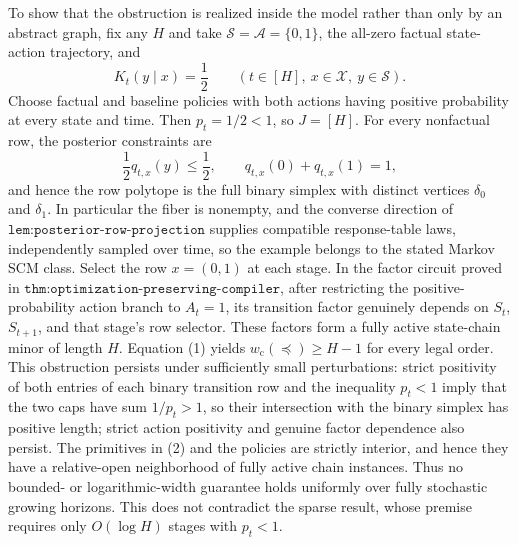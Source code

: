 To show that the obstruction is realized inside the model rather than only by an abstract graph, fix any \(H\) and take \(\mathcal S=\mathcal A=\{0,1\}\), the all-zero factual state-action trajectory, and
\[
 K_t(y\mid x)=\frac12
 \qquad(t\in[H],\ x\in\mathcal X,\ y\in\mathcal S).
 \tag{2}
\]
Choose factual and baseline policies with both actions having positive probability at every state and time.  Then \(p_t=1/2<1\), so \(J=[H]\).  For every nonfactual row, the posterior constraints are
\[
 \frac12q_{t,x}(y)\le\frac12,
 \qquad q_{t,x}(0)+q_{t,x}(1)=1,
\]
and hence the row polytope is the full binary simplex with distinct vertices \(\delta_0\) and \(\delta_1\).  In particular the fiber is nonempty, and the converse direction of \(\texttt{lem:posterior-row-projection}\) supplies compatible response-table laws, independently sampled over time, so the example belongs to the stated Markov SCM class.  Select the row \(x=(0,1)\) at each stage.  In the factor circuit proved in \(\texttt{thm:optimization-preserving-compiler}\), after restricting the positive-probability action branch to \(A_t=1\), its transition factor genuinely depends on \(S_t\), \(S_{t+1}\), and that stage's row selector.  These factors form a fully active state-chain minor of length \(H\).  Equation (1) yields \(w_{\mathrm c}(\preceq)\ge H-1\) for every legal order.  This obstruction persists under sufficiently small perturbations: strict positivity of both entries of each binary transition row and the inequality \(p_t<1\) imply that the two caps have sum \(1/p_t>1\), so their intersection with the binary simplex has positive length; strict action positivity and genuine factor dependence also persist.  The primitives in (2) and the policies are strictly interior, and hence they have a relative-open neighborhood of fully active chain instances.  Thus no bounded- or logarithmic-width guarantee holds uniformly over fully stochastic growing horizons.  This does not contradict the sparse result, whose premise requires only \(O(\log H)\) stages with \(p_t<1\).